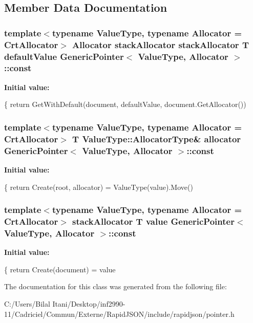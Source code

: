 \subsection{Member Data Documentation}
\subsubsection[{\texorpdfstring{const}{const}}]{\setlength{\rightskip}{0pt plus 5cm}template$<$typename Value\+Type, typename Allocator = Crt\+Allocator$>$ Allocator stack\+Allocator stack\+Allocator T default\+Value {\bf Generic\+Pointer}$<$ Value\+Type, Allocator $>$\+::const}\hypertarget{class_generic_pointer_ad6e06cd83cf52e045c7e07a67078e973}{}\label{class_generic_pointer_ad6e06cd83cf52e045c7e07a67078e973}
{\bfseries Initial value\+:}
\begin{DoxyCode}
\{
        \textcolor{keywordflow}{return} GetWithDefault(document, defaultValue, document.GetAllocator())
\end{DoxyCode}
\subsubsection[{\texorpdfstring{const}{const}}]{\setlength{\rightskip}{0pt plus 5cm}template$<$typename Value\+Type, typename Allocator = Crt\+Allocator$>$ T Value\+Type\+::\+Allocator\+Type\& allocator {\bf Generic\+Pointer}$<$ Value\+Type, Allocator $>$\+::const}\hypertarget{class_generic_pointer_ace82428d4ad958b05a52480d949b32fa}{}\label{class_generic_pointer_ace82428d4ad958b05a52480d949b32fa}
{\bfseries Initial value\+:}
\begin{DoxyCode}
\{
        \textcolor{keywordflow}{return} Create(root, allocator) = ValueType(value).Move()
\end{DoxyCode}
\subsubsection[{\texorpdfstring{const}{const}}]{\setlength{\rightskip}{0pt plus 5cm}template$<$typename Value\+Type, typename Allocator = Crt\+Allocator$>$ stack\+Allocator T value {\bf Generic\+Pointer}$<$ Value\+Type, Allocator $>$\+::const}\hypertarget{class_generic_pointer_abb1b141cfe93b7159842b5cad60d1be3}{}\label{class_generic_pointer_abb1b141cfe93b7159842b5cad60d1be3}
{\bfseries Initial value\+:}
\begin{DoxyCode}
\{
            \textcolor{keywordflow}{return} Create(document) = value
\end{DoxyCode}


The documentation for this class was generated from the following file\+:\begin{DoxyCompactItemize}
\item 
C\+:/\+Users/\+Bilal Itani/\+Desktop/inf2990-\/11/\+Cadriciel/\+Commun/\+Externe/\+Rapid\+J\+S\+O\+N/include/rapidjson/pointer.\+h\end{DoxyCompactItemize}
